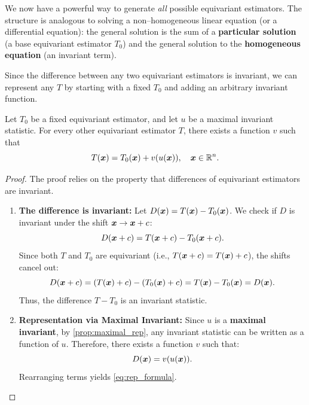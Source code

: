 We now have a powerful way to generate \textit{all} possible equivariant estimators. The structure is analogous to solving a non--homogeneous linear equation (or a differential equation): the general solution is the sum of a \textbf{particular solution} (a base equivariant estimator \(T_0\)) and the general solution to the \textbf{homogeneous equation} (an invariant term).

Since the difference between any two equivariant estimators is invariant, we can represent any \(T\) by starting with a fixed \(T_0\) and adding an arbitrary invariant function.



\begin{lemma}
\label{lemma:rep_equi_est}
Let \(T_0\) be a fixed equivariant estimator, and let \(u\) be a maximal invariant statistic.
For every other equivariant estimator \(T\), there exists a function \(v\) such that
\begin{equation}
T(\boldsymbol{x}) = T_0(\boldsymbol{x}) + v(u(\boldsymbol{x})), \quad \boldsymbol{x} \in \mathbb{R}^n.
\label{eq:rep_formula}
\end{equation}
\end{lemma}

\begin{proof}
The proof relies on the property that differences of equivariant estimators are invariant.

\begin{enumerate}
    \item \textbf{The difference is invariant:} Let \(D(\boldsymbol{x}) = T(\boldsymbol{x}) - T_0(\boldsymbol{x})\). We check if \(D\) is invariant under the shift \(\boldsymbol{x} \to \boldsymbol{x} + c\):
    \[
    D(\boldsymbol{x} + c) = T(\boldsymbol{x} + c) - T_0(\boldsymbol{x} + c).
    \]
    Since both \(T\) and \(T_0\) are equivariant (i.e., \(T(\boldsymbol{x}+c) = T(\boldsymbol{x}) + c\)), the shifts cancel out:
    \[
    D(\boldsymbol{x} + c) = (T(\boldsymbol{x}) + c) - (T_0(\boldsymbol{x}) + c) = T(\boldsymbol{x}) - T_0(\boldsymbol{x}) = D(\boldsymbol{x}).
    \]
    Thus, the difference \(T - T_0\) is an invariant statistic.

    \item \textbf{Representation via Maximal Invariant:} Since \(u\) is a \textbf{maximal invariant}, by \autoref{prop:maximal_rep}, any invariant statistic can be written as a function of \(u\). Therefore, there exists a function \(v\) such that:
    \[
    D(\boldsymbol{x}) = v(u(\boldsymbol{x})).
    \]
    Rearranging terms yields \eqref{eq:rep_formula}.
\end{enumerate}
\end{proof}

